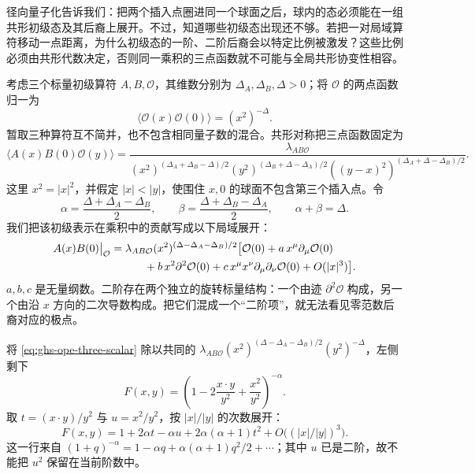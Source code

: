 径向量子化告诉我们：把两个插入点圈进同一个球面之后，球内的态必须能在一组共形初级态及其后裔上展开。不过，知道哪些初级态出现还不够。若把一对局域算符移动一点距离，为什么初级态的一阶、二阶后裔会以特定比例被激发？这些比例必须由共形代数决定，否则同一乘积的三点函数就不可能与全局共形协变性相容。


考虑三个标量初级算符 $A,B,\mathcal O$，其维数分别为 $\Delta_A,\Delta_B,\Delta>0$；将 $\mathcal O$ 的两点函数归一为
\begin{equation}\label{eq:ghs-ope-scalar-normalization}
 \langle\mathcal O(x)\mathcal O(0)\rangle=(x^2)^{-\Delta}.
\end{equation}
暂取三种算符互不简并，也不包含相同量子数的混合。共形对称把三点函数固定为
\begin{equation}\label{eq:ghs-ope-three-scalar}
 \langle A(x)B(0)\mathcal O(y)\rangle
 =\frac{\lambda_{AB\mathcal O}}
 {(x^2)^{(\Delta_A+\Delta_B-\Delta)/2}
 (y^2)^{(\Delta_B+\Delta-\Delta_A)/2}
 ((y-x)^2)^{(\Delta_A+\Delta-\Delta_B)/2}}.
\end{equation}
这里 $x^2=|x|^2$，并假定 $|x|<|y|$，使围住 $x,0$ 的球面不包含第三个插入点。令
\begin{equation}\label{eq:ghs-ope-alpha-beta}
 \alpha=\frac{\Delta+\Delta_A-\Delta_B}{2},\qquad
 \beta=\frac{\Delta+\Delta_B-\Delta_A}{2},\qquad
 \alpha+\beta=\Delta.
\end{equation}
我们把该初级表示在乘积中的贡献写成以下局域展开：
\begin{align}\label{eq:ghs-ope-scalar-level-two}
 A(x)B(0)\big|_{\mathcal O}
 =&\;\lambda_{AB\mathcal O}(x^2)^{(\Delta-\Delta_A-\Delta_B)/2}
 \bigl[\mathcal O(0)+a\,x^\mu\partial_\mu\mathcal O(0)
 \\&\qquad+b\,x^2\partial^2\mathcal O(0)
 +c\,x^\mu x^\nu\partial_\mu\partial_\nu\mathcal O(0)
 +O(|x|^3)\bigr].\notag
\end{align}
$a,b,c$ 是无量纲数。二阶存在两个独立的旋转标量结构：一个由迹 $\partial^2\mathcal O$ 构成，另一个由沿 $x$ 方向的二次导数构成。把它们混成一个“二阶项”，就无法看见零范数后裔对应的极点。


将 \cref{eq:ghs-ope-three-scalar} 除以共同的 $\lambda_{AB\mathcal O}(x^2)^{(\Delta-\Delta_A-\Delta_B)/2}(y^2)^{-\Delta}$，左侧剩下
\begin{equation}\label{eq:ghs-ope-kinematic-ratio}
 F(x,y)=\left(1-2\frac{x\cdot y}{y^2}+\frac{x^2}{y^2}\right)^{-\alpha}.
\end{equation}
取 $t=(x\cdot y)/y^2$ 与 $u=x^2/y^2$，按 $|x|/|y|$ 的次数展开：
\begin{equation}\label{eq:ghs-ope-ratio-expansion}
 F(x,y)=1+2\alpha t-\alpha u+2\alpha(\alpha+1)t^2
 +O\bigl((|x|/|y|)^3\bigr).
\end{equation}
这一行来自 $(1+q)^{-\alpha}=1-\alpha q+\alpha(\alpha+1)q^2/2+\cdots$；其中 $u$ 已是二阶，故不能把 $u^2$ 保留在当前阶数中。

